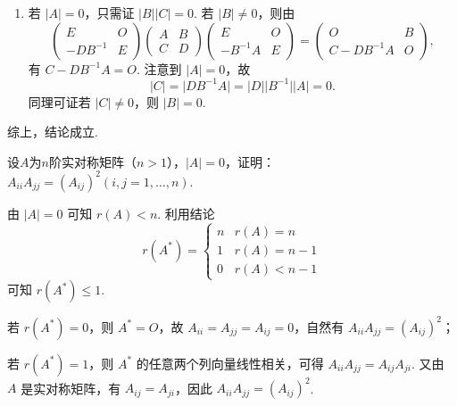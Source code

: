 \begin{exercise}
\begin{exgroup}
\begin{answer}
\begin{enumerate}
                \item 若 $\lvert A \rvert = 0$，只需证 $\lvert B \rvert \lvert C \rvert = 0$. 若 $\lvert B \rvert \neq 0$，则由
                    \[\begin{pmatrix}
                            E        & O \\
                            -DB^{-1} & E
                        \end{pmatrix} \begin{pmatrix}
                            A & B \\
                            C & D
                        \end{pmatrix} \begin{pmatrix}
                            E        & O \\
                            -B^{-1}A & E
                        \end{pmatrix} = \begin{pmatrix}
                            O          & B \\
                            C-DB^{-1}A & O
                        \end{pmatrix},\]
                    有 $C-DB^{-1}A = O$. 注意到 $\lvert A \rvert = 0$，故 \[\lvert C \rvert = \lvert DB^{-1}A \rvert = \lvert D \rvert \lvert B^{-1} \rvert \lvert A \rvert = 0.\] 同理可证若 $\lvert C \rvert \neq 0$，则 $\lvert B \rvert = 0$.
            \end{enumerate}
            综上，结论成立.
        \end{answer}

        \item 设$A$为$n$阶实对称矩阵（$n>1$），$|A|=0$，证明：$A_{ii}A_{jj}=(A_{ij})^2(i,j=1,\ldots,n)$.
        \begin{answer}
            由 $|A| = 0$ 可知 $r(A) < n$. 利用结论
            \[
                r(A^*)=\begin{cases}
                    n & r(A)=n     \\
                    1 & r(A)=n-1   \\
                    0 & r(A) < n-1
                \end{cases}
            \]
            可知 $r(A^*) \leqslant 1$.

            若 $r(A^*) = 0$，则 $A^* = O$，故 $A_{ii} = A_{jj} = A_{ij} = 0$，自然有 $A_{ii}A_{jj}=(A_{ij})^2$；

            若 $r(A^*) = 1$，则 $A^*$ 的任意两个列向量线性相关，可得 $A_{ii}A_{jj} = A_{ij}A_{ji}$. 又由 $A$ 是实对称矩阵，有 $A_{ij} = A_{ji}$，因此 $A_{ii}A_{jj} = (A_{ij})^2$.


\end{answer}
\end{exgroup}
\end{exercise}
